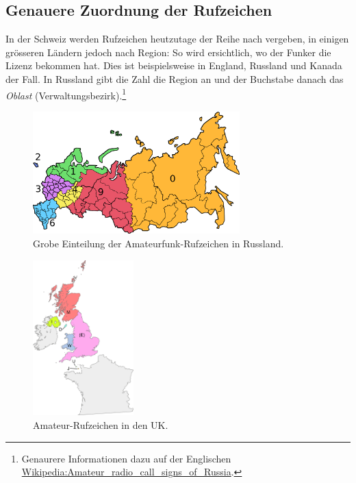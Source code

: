 {\subsection{Genauere Zuordnung der Rufzeichen}
In der Schweiz werden Rufzeichen heutzutage der Reihe nach vergeben, in einigen grösseren Ländern jedoch nach Region: So wird ersichtlich, wo der Funker die Lizenz bekommen hat. Dies ist beispielsweise in England, Russland und Kanada der Fall. In Russland gibt die Zahl die Region an und der Buchstabe danach das \textit{Oblast} (Verwaltungsbezirk).\footnote{Genaurere Informationen dazu auf der Englischen \href{http://en.wikipedia.org/wiki/Amateur\_radio\_call\_signs\_of\_Russia}{Wikipedia:Amateur\_radio\_call\_signs\_of\_Russia}.}

\begin{figure}[h!]
 \centering
 \includegraphics[width=8cm]{./png/Russia-amateur-callsign-districts.png}
 \caption{Grobe Einteilung der Amateurfunk-Rufzeichen in Russland. }
 \label{fig:callsignsRU}
\end{figure}

\begin{figure}[h!]
 \centering
 \includegraphics[height=6cm]{./png/UK-amateur-radio-regional-locators.png}
 \caption{Amateur-Rufzeichen in den UK. }
 \label{fig:callsignsUK}
\end{figure}



}
